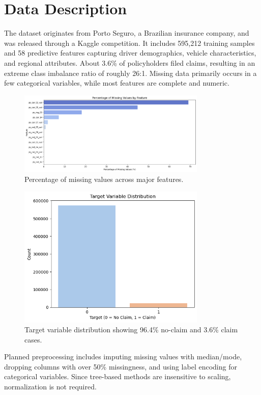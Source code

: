 \documentclass[11pt]{article}
\begin{document}
\section{Data Description}
The dataset originates from Porto Seguro, a Brazilian insurance company, and was released through a Kaggle competition. It includes 595,212 training samples and 58 predictive features capturing driver demographics, vehicle characteristics, and regional attributes. About 3.6\% of policyholders filed claims, resulting in an extreme class imbalance ratio of roughly 26:1. Missing data primarily occurs in a few categorical variables, while most features are complete and numeric.
\begin{figure}[h]
    \centering
    \includegraphics[width=0.8\textwidth]{../figures/missing_barplot.png}
    \caption{Percentage of missing values across major features.}
\end{figure}

\begin{figure}[h]
    \centering
    \includegraphics[width=0.8\textwidth]{../figures/target_distribution.png}
    \caption{Target variable distribution showing 96.4\% no-claim and 3.6\% claim cases.}
\end{figure}

Planned preprocessing includes imputing missing values with median/mode, dropping columns with over 50\% missingness, and using label encoding for categorical variables. Since tree-based methods are insensitive to scaling, normalization is not required.
\end{document}
